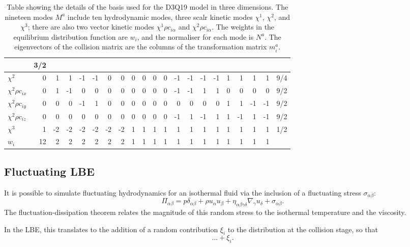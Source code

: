 \begin{table}[t]
\begin{tabular}{|l||r|rrrrrr|rrrr|rrrr|rrrr|r||}
& 3/2\\
\hline
$\chi^2$ & 0 &  1 &  1 &  -1&  -1 &  0 &  0 & 
         0 &  0 &  0 &  0 &  -1 &  -1 & -1 & -1 & 1 & 1 & 1 & 1
& 9/4\\
\hline
$\chi^2 \rho c_{ix}$ & 0 &  1 &  -1 &  0&  0 &  0 &  0 & 
         0 &  0 &  0 &  0 &  -1 &  -1 & 1 & 1 & 0 & 0 & 0 & 0
& 9/2\\
\hline
$\chi^2 \rho c_{iy}$ & 0 &  0 &  0 & -1&   1 &  0 &  0 & 
         0 &  0 &  0 &  0 &   0 &  0 & 0 & 0 & 1 &  1 & -1 & -1
& 9/2\\
\hline
$\chi^2 \rho c_{iz}$ & 0 &  0 &  0 &  0&  0 &  0 &  0 & 
         0 &  0 &  0 &  0 &  -1 &  1 & -1 & 1 & 1 & -1 & 1 & -1
& 9/2\\
\hline
$\chi^3$ & 1 &  -2 &  -2 &  -2&  -2 &  -2 &  -2 & 
         1 &  1 &  1 &  1 &  1 &  1 & 1 & 1 & 1 & 1 & 1 & 1
& 1/2\\
\hline\hline
$w_i$ & 12 & 2 & 2 & 2 & 2 & 2 & 2 & 
1 & 1 & 1 & 1 & 1 & 1 & 1 & 1 & 1 & 1 & 1 & 1
& \\
\hline\hline
\end{tabular}
\caption{Table showing the details of the basis used for the D3Q19 model in
three dimensions. The nineteen modes $M^a$ include ten hydrodynamic modes,
three scalr kinetic modes $\chi^1$, $\chi^2$, and $\chi^3$; there are also
two vector kinetic modes $\chi^1 \rho c_{i\alpha}$
and $\chi^2 \rho c_{i\alpha}$. The weights in the equilibrium distribution
function are $w_i$, and the normaliser for each mode is $N^a$. The
eigenvectors of the collision matrix are the columns of the transformation
matrix $m^a_i$.
\label{table-d3q19-spec}
}
\end{table}


\subsection{Fluctuating LBE}

It is possible \cite{adhikari2005} to simulate fluctuating
hydrodynamics for an isothermal fluid via the inclusion of
a fluctuating stress $\sigma_{\alpha\beta}$:
\begin{equation}
\Pi_{\alpha\beta} = p\delta_{\alpha\beta} + \rho u_\alpha u_\beta
+ \eta_{\alpha\beta\gamma\delta} \nabla_\gamma u_\delta + \sigma_{\alpha\beta}.
\end{equation}
The fluctuation-dissipation theorem relates the magnitude of this
random stress to the isothermal temperature and the viscosity.

In the LBE, this translates to the addition of a random contribution
$\xi_i$ to the distribution at the collision stage, so that
\begin{equation}
\ldots + \xi_i.
\end{equation}

